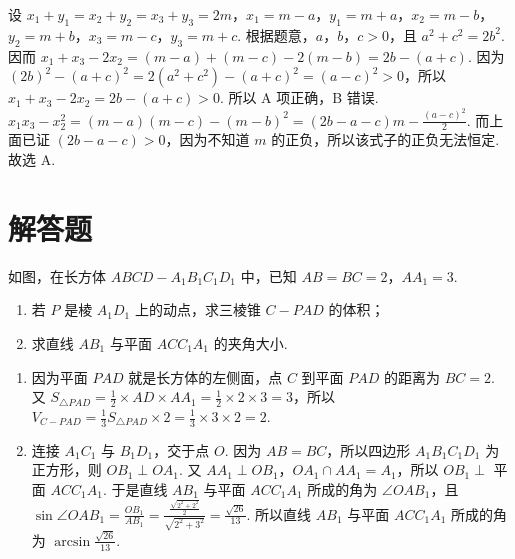 \begin{solution}
设 \(x_1+y_1=x_2+y_2=x_3+y_3=2m\)，\(x_1=m-a\)，\(y_1=m+a\)，\(x_2=m-b\)，\(y_2=m+b\)，\(x_3=m-c\)，\(y_3=m+c\). 根据题意，\(a\)，\(b\)，\(c>0\)，且 \(a^2+c^2=2b^2\). 因而
\(x_1+x_3-2x_2=\left( m-a \right)+\left( m-c \right)-2\left( m-b \right)=2b-\left( a+c \right)\). 因为 \(\left( 2b \right)^2-\left( a+c \right)^2=2\left( a^2+c^2 \right)-\left( a+c \right)^2=(a-c)^2>0\)，所以 \(x_1+x_3-2x_2=2b-\left( a+c \right)>0\). 所以 A 项正确，B 错误. \(x_1x_3-x_2^2=\left( m-a \right)\left( m-c \right)-\left( m-b \right)^2=\left( 2b-a-c \right)m-\frac{\left( a-c \right)^2}{2}\). 而上面已证 \(\left( 2b-a-c \right)>0\)，因为不知道 \(m\) 的正负，所以该式子的正负无法恒定. 故选 A.
\end{solution}
\section{解答题}

\begin{problem}
如图，在长方体 \(ABCD-A_1B_1C_1D_1\) 中，已知 \(AB=BC=2\)，\(AA_1=3\).

\begin{enumerate}
\item 若 \(P\) 是棱 \(A_1D_1\) 上的动点，求三棱锥 \(C-PAD\) 的体积；
\item 求直线 \(AB_1\) 与平面 \(ACC_1A_1\) 的夹角大小.
\end{enumerate}

\end{problem}

\begin{solution}
\begin{enumerate}
\item 因为平面 \(PAD\) 就是长方体的左侧面，点 \(C\) 到平面 \(PAD\) 的距离为 \(BC=2\). 又 \(S_{\triangle PAD}=\frac12\times AD\times AA_1=\frac12\times 2\times 3=3\)，所以 \(V_{C-PAD}=\frac13 S_{\triangle PAD}\times 2=\frac13\times 3\times 2=2\).

\item

连接 \(A_1C_1\) 与 \(B_1D_1\)，交于点 \(O\). 因为 \(AB=BC\)，所以四边形 \(A_1B_1C_1D_1\) 为正方形，则 \(OB_1\perp OA_1\). 又 \(AA_1\perp OB_1\)，\(OA_1\cap AA_1=A_1\)，所以 \(OB_1\perp\) 平面 \(ACC_1A_1\). 于是直线 \(AB_1\) 与平面 \(ACC_1A_1\) 所成的角为 \(\angle OAB_1\)，且 \(\sin \angle OAB_1=\frac{OB_1}{AB_1}=\frac{\frac{\sqrt{2^2+2^2}}{2}}{\sqrt{2^2+3^2}}=\frac{\sqrt{26}}{13}\). 所以直线 \(AB_1\) 与平面 \(ACC_1A_1\) 所成的角为 \(\arcsin \frac{\sqrt{26}}{13}\).
\end{enumerate}
\end{solution}

